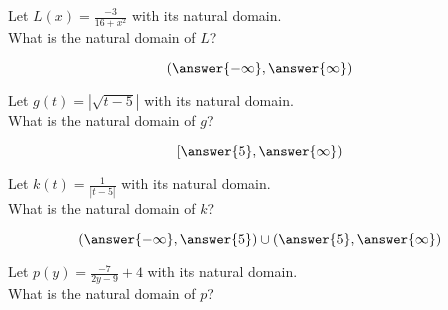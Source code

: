 \documentclass{ximera}
\author{Lee Wayand}
\begin{document}
\begin{exercise}








\begin{question}


Let $L(x) = \frac{-3}{16 + x^2}$ with its natural domain. \\

What is the natural domain of $L$?

\[
\left( \answer{-\infty}, \answer{\infty}  \right)
\]


\end{question}







\begin{question}


Let $g(t) = \left| \sqrt{t - 5} \right|$ with its natural domain. \\

What is the natural domain of $g$?

\[
\left[ \answer{5}, \answer{\infty}  \right)
\]


\end{question}








\begin{question}


Let $k(t) = \frac{1}{| t - 5 |}$ with its natural domain. \\

What is the natural domain of $k$?

\[
\left( \answer{-\infty}, \answer{5} \right) \cup \left( \answer{5}, \answer{\infty}  \right)
\]


\end{question}













\begin{question}


Let $p(y) = \frac{-7}{2y - 9} + 4$ with its natural domain. \\

What is the natural domain of $p$?


\end{question}
\end{exercise}
\end{document}
